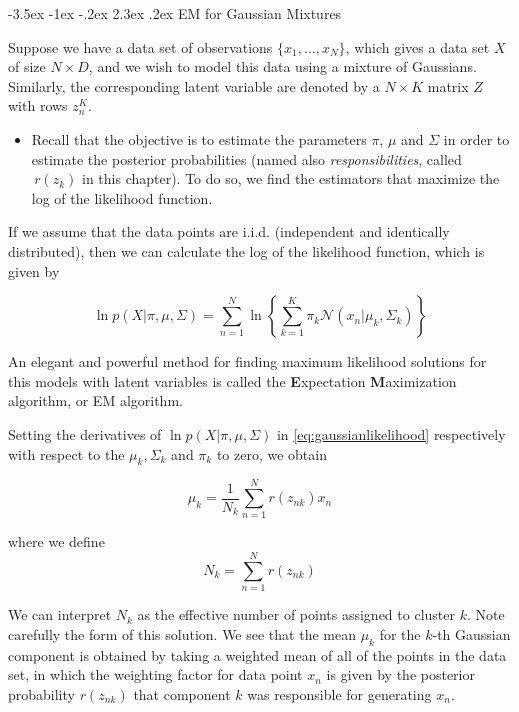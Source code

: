 \documentclass[]{book}
\makeatletter
\newenvironment{rmdblock}[1]
  {\begin{shaded*}
  \begin{itemize}
  \renewcommand{\labelitemi}{
    \raisebox{-.7\height}[0pt][0pt]{
      {\setkeys{Gin}{width=2em,keepaspectratio}\texttt{[image: img/icons/\#1]}}
    }
  }
  \item
  }
  {
  \end{itemize}
  \end{shaded*}
  }
\newenvironment{rmdinsight}
  {\begin{rmdblock}{insight}}
  {\end{rmdblock}}
\renewcommand\section{\@startsection {section}{1}{\z@}%
                                   {-3.5ex \@plus -1ex \@minus -.2ex}%
                                   {2.3ex \@plus.2ex}%
                                   {\normalfont\Large\bfseries\color{ForestGreen}}}
\theoremstyle{definition}
\theoremstyle{definition}
\theoremstyle{definition}
\theoremstyle{remark}
\makeatother
\begin{document}
\section{EM for Gaussian Mixtures}\label{em-for-gaussian-mixtures}

Suppose we have a data set of observations \(\{x_1, \ldots, x_N\}\),
which gives a data set \(X\) of size \(N \times D\), and we wish to
model this data using a mixture of Gaussians. Similarly, the
corresponding latent variable are denoted by a \(N \times K\) matrix
\(Z\) with rows \(z_n^K\).

\begin{rmdinsight}
Recall that the objective is to estimate the parameters \(\pi\), \(\mu\)
and \(\Sigma\) in order to estimate the posterior probabilities (named
also \emph{responsibilities}, called \(\, r(z_k)\) in this chapter). To
do so, we find the estimators that maximize the log of the likelihood
function.
\end{rmdinsight}

If we assume that the data points are i.i.d. (independent and
identically distributed), then we can calculate the log of the
likelihood function, which is given by

\begin{equation}
\label{eq:gaussianlikelihood}
\ln p(X|\pi,\mu,\Sigma)=\sum_{n=1}^{N} \ln \left\lbrace \sum_{k=1}^{K} \pi_k \mathcal{N}(x_n | \mu_k, \Sigma_k) \right\rbrace
\end{equation}

An elegant and powerful method for finding maximum likelihood solutions
for this models with latent variables is called the \textbf{E}xpectation
\textbf{M}aximization algorithm, or EM algorithm.

Setting the derivatives of \(\ln p(X|\pi,\mu,\Sigma)\) in
\eqref{eq:gaussianlikelihood} respectively with respect to the
\(\mu_k,\Sigma_k\) and \(\pi_k\) to zero, we obtain

\begin{equation}
\label{eq:means}
\mu_k = \frac{1}{N_k} \sum_{n=1}^{N} r(z_{nk}) x_n
\end{equation}

where we define \[N_k= \sum_{n=1}^{N}r(z_{nk})\]

We can interpret \(N_k\) as the effective number of points assigned to
cluster \(k\). Note carefully the form of this solution. We see that the
mean \(\mu_k\) for the \(k\)-th Gaussian component is obtained by taking
a weighted mean of all of the points in the data set, in which the
weighting factor for data point \(x_n\) is given by the posterior
probability \(r(z_{nk})\) that component \(k\) was responsible for
generating \(x_n\).
\end{document}
